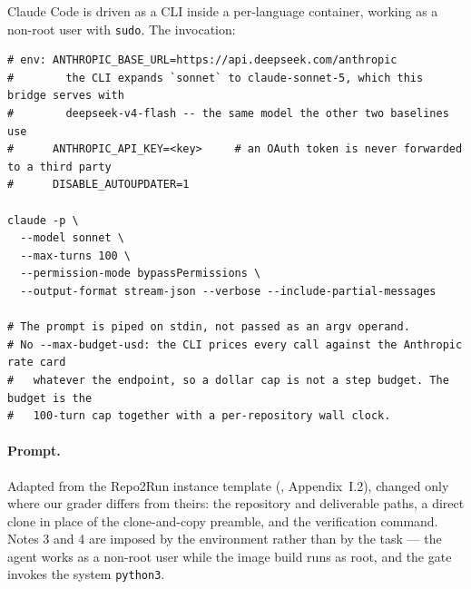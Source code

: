 Claude Code is driven as a CLI inside a per-language container, working as a
non-root user with \texttt{sudo}. The invocation:

\begin{lstlisting}[style=promptstyle]
# env: ANTHROPIC_BASE_URL=https://api.deepseek.com/anthropic
#        the CLI expands `sonnet` to claude-sonnet-5, which this bridge serves with
#        deepseek-v4-flash -- the same model the other two baselines use
#      ANTHROPIC_API_KEY=<key>     # an OAuth token is never forwarded to a third party
#      DISABLE_AUTOUPDATER=1

claude -p \
  --model sonnet \
  --max-turns 100 \
  --permission-mode bypassPermissions \
  --output-format stream-json --verbose --include-partial-messages

# The prompt is piped on stdin, not passed as an argv operand.
# No --max-budget-usd: the CLI prices every call against the Anthropic rate card
#   whatever the endpoint, so a dollar cap is not a step budget. The budget is the
#   100-turn cap together with a per-repository wall clock.
\end{lstlisting}

\paragraph{Prompt.}
Adapted from the Repo2Run instance template (\citealp{repo2run},
Appendix~I.2), changed only where our grader differs from theirs: the repository
and deliverable paths, a direct clone in place of the clone-and-copy preamble,
and the verification command. Notes 3 and 4 are imposed by the environment
rather than by the task --- the agent works as a non-root user while the image
build runs as root, and the gate invokes the system \texttt{python3}. 


